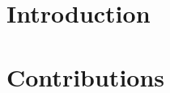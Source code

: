 \cleardoublepage


\cleardoublepage

\pagestyle{scrheadings}

\cleardoublepage

\cleardoublepage



\cleardoublepage


\part{Introduction}

\cleardoublepage


\part{Contributions}

\cleardoublepage

